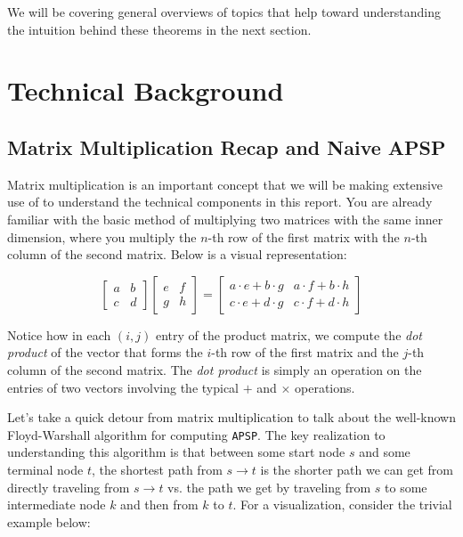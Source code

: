 \documentclass[12pt]{article}
\begin{document}
We will be covering general overviews of topics that help toward understanding the intuition behind these theorems in the next section.

\section{Technical Background}

\subsection{Matrix Multiplication Recap and Naive APSP} \label{sec:3.1}

Matrix multiplication is an important concept that we will be making extensive use of to understand the technical components in this report. You are already familiar with the basic method of multiplying two matrices with the same inner dimension, where you multiply the $n$-th row of the first matrix with the $n$-th column of the second matrix. Below is a visual representation:

\[
    \begin{bmatrix}
        a & b \\
        c & d
    \end{bmatrix}
    \begin{bmatrix}
        e & f \\
        g & h
    \end{bmatrix}
    =
    \begin{bmatrix}
        a \cdot e + b \cdot g & a \cdot f + b \cdot h \\
        c \cdot e + d \cdot g & c \cdot f + d \cdot h
    \end{bmatrix}
\]

Notice how in each $(i, j)$ entry of the product matrix, we compute the \emph{dot product} of the vector that forms the $i$-th row of the first matrix and the $j$-th column of the second matrix. The \emph{dot product} is simply an operation on the entries of two vectors involving the typical $+$ and $\times$ operations.

Let's take a quick detour from matrix multiplication to talk about the well-known Floyd-Warshall algorithm for computing \texttt{APSP}. The key realization to understanding this algorithm is that between some start node $s$ and some terminal node $t$, the shortest path from $s \to t$ is the shorter path we can get from directly traveling from $s \to t$ vs. the path we get by traveling from $s$ to some intermediate node $k$ and then from $k$ to $t$. For a visualization, consider the trivial example below:
\end{document}
